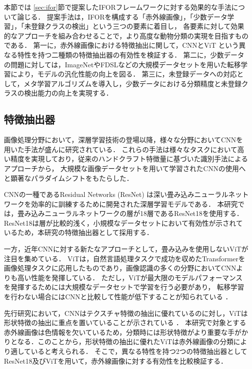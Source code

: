本節では \ref{sec:ifor}節で提案したIFORフレームワークに対する効果的な手法について論じる．
提案手法は，IFORを構成する「赤外線画像」，「少数データ学習」，「未登録クラスの検出」という三つの要素に着目し，
各要素に対して効果的なアプローチを組み合わせることで，より高度な動物分類の実現を目指すものである．
第一に，赤外線画像における特徴抽出に関して，CNNとViT \cite{vit}という異なる特性を持つ二種類の特徴抽出器の有効性を検証する．
第二に，少数データの問題に対しては，ImageNetやFDSLなどの大規模データセットを用いた転移学習により，モデルの汎化性能の向上を図る．
第三に，未登録データへの対応として，メタ学習アルゴリズムを導入し，少数データにおける分類精度と未登録クラスの検出能力の向上を実現する．

\subsection{特徴抽出器}

画像処理分野において，深層学習技術の登場以降，様々な分野においてCNNを用いた手法が盛んに研究されている．
これらの手法は様々なタスクにおいて高い精度を実現しており，従来のハンドクラフト特徴量に基づいた識別手法によるアプローチから，
大規模な画像データセットを用いて学習されたCNNの使用へと顕著なパラダイムシフトをもたらした．

CNNの一種であるResidual Networks (ResNet) \cite{resnet}は深い畳み込みニューラルネットワークを効率的に訓練するために開発された深層学習モデルである．
本研究では，畳み込みニューラルネットワークの層が18層であるResNet18を使用する．
ResNet18は層が比較的浅く，小規模なデータセットにおいて有効性が示されているため，本研究の特徴抽出器として採用する．

一方，近年CNNに対する新たなアプローチとして，畳み込みを使用しないViTが注目を集めている．
ViTは，自然言語処理タスクで成功を収めたTransformerを画像処理タスクに応用したものであり，画像認識の多くの分野においてCNNよりも高い性能を発揮している．
ただし，ViTが最大限のモデルパフォーマンスを発揮するためには大規模なデータセットで学習を行う必要があり，
転移学習を行わない場合にはCNNと比較して性能が低下することが知られている \cite{vit}．

先行研究において，CNNはテクスチャ特徴の抽出に優れているのに対し，ViTは形状特徴の抽出に重点を置いていることが示されている \cite{feature}．
本研究で対象とする赤外線画像は色情報を欠いているため，分類時には形状特徴がより重要な手がかりとなる．このことから，形状特徴の抽出に優れたViTは赤外線画像の分類により適していると考えられる．
そこで，異なる特性を持つ2つの特徴抽出器としてResNet18及びViTを用いて，赤外線画像に対する有効性を比較検証する．

